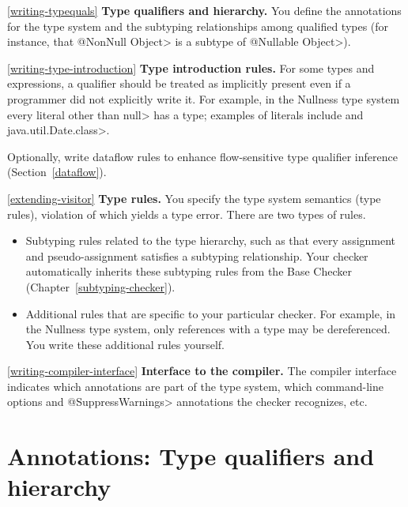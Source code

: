 \begin{description}

\item{\ref{writing-typequals}}
  \textbf{Type qualifiers and hierarchy.}  You define the annotations for
  the type system and the subtyping relationships among qualified types
  (for instance, that \<@NonNull Object> is a subtype of \<@Nullable
  Object>).

\item{\ref{writing-type-introduction}}
  \textbf{Type introduction rules.}  For some types and
  expressions, a qualifier should be treated as implicitly present even if a
  programmer did not explicitly write it.  For example, in the Nullness
  type system every literal
  other than \<null> has a  type;
  examples of literals include  and \<java.util.Date.class>.

  Optionally, write dataflow rules to enhance flow-sensitive type qualifier
  inference (Section~\ref{dataflow}).

\item{\ref{extending-visitor}}
  \textbf{Type rules.}  You specify the type system semantics (type
  rules), violation of which yields a type error.  There are two types of
  rules.
\begin{itemize}
\item
  Subtyping rules related to the type hierarchy, such as that every
  assignment and pseudo-assignment satisfies a subtyping relationship.
  Your checker automatically inherits these subtyping rules from the Base
  Checker (Chapter~\ref{subtyping-checker}).
\item
  Additional rules that are specific to your particular checker.  For
  example, in the Nullness type system, only references with a
   type may be dereferenced.  You
  write these additional rules yourself.
\end{itemize}

\item{\ref{writing-compiler-interface}}
  \textbf{Interface to the compiler.}  The compiler interface indicates
  which annotations are part of the type system, which command-line options
  and \<@SuppressWarnings> annotations the checker recognizes, etc.
\end{description}


\section{Annotations: Type qualifiers and hierarchy\label{writing-typequals}}

